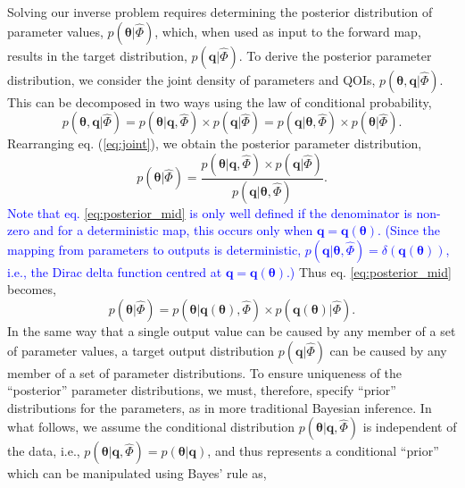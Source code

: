 Solving our inverse problem requires determining the posterior distribution of parameter values, $p(\boldsymbol{\theta}|\hat{\Phi})$, which, when used as input to the forward map, results in the target distribution, $p(\boldsymbol{q}|\hat{\Phi})$. To derive the posterior parameter distribution, we consider the joint density of parameters and QOIs, $p(\boldsymbol{\theta},\boldsymbol{q}|\hat{\Phi})$. This can be decomposed in two ways using the law of conditional probability,
%
\begin{equation}\label{eq:joint}
  p( \boldsymbol{\theta}, \boldsymbol{q}|\hat{\Phi})
= p( \boldsymbol{\theta}|\boldsymbol{q}, \hat{\Phi}) \times p(\boldsymbol{q}|\hat{\Phi})
= p( \boldsymbol{q}|\boldsymbol{\theta}, \hat{\Phi}) \times p(\boldsymbol{\theta}|\hat{\Phi}).
\end{equation}
%
Rearranging eq. (\ref{eq:joint}), we obtain the posterior parameter distribution,
%
\begin{equation}\label{eq:posterior_mid}
p(\boldsymbol{\theta}|\hat{\Phi})
= \frac{p(\boldsymbol{\theta}|\boldsymbol{q}, \hat{\Phi}) \times p(\boldsymbol{q}|\hat{\Phi})}{p(\boldsymbol{q}| \boldsymbol{\theta}, \hat{\Phi})}.
\end{equation}
%
\textcolor{blue}{Note that eq. \eqref{eq:posterior_mid} is only well defined if the denominator is non-zero and for a deterministic map, this occurs only when $\boldsymbol{q}=\boldsymbol{q}(\boldsymbol{\theta})$. (Since the mapping from parameters to outputs is deterministic, $p(\boldsymbol{q}| \boldsymbol{\theta}, \hat{\Phi})=\delta(\boldsymbol{q}(\boldsymbol{\theta}))$, i.e., the Dirac delta function centred at $\boldsymbol{q}=\boldsymbol{q}(\boldsymbol{\theta})$.)  }
 Thus eq. \eqref{eq:posterior_mid} becomes,
%
\begin{equation}\label{eq:posterior_mid1}
p(\boldsymbol{\theta}|\hat{\Phi})
= p(\boldsymbol{\theta}|\boldsymbol{q}(\boldsymbol{\theta}), \hat{\Phi}) \times p(\boldsymbol{q}(\boldsymbol{\theta})|\hat{\Phi}).
\end{equation}
%
In the same way that a single output value can be caused by any member of a set of parameter values, a target output distribution $p(\boldsymbol{q}|\hat{\Phi})$ can be caused by any member of a set of parameter distributions. To ensure uniqueness of the ``posterior'' parameter distributions, we must, therefore, specify ``prior'' distributions for the parameters, as in more traditional Bayesian inference. In what follows, we assume the conditional distribution $p(\boldsymbol{\theta}|\boldsymbol{q}, \hat{\Phi})$ is independent of the data, i.e., $p(\boldsymbol{\theta}|\boldsymbol{q}, \hat{\Phi})=p(\boldsymbol{\theta}|\boldsymbol{q})$, and thus represents a conditional ``prior'' which can be manipulated using Bayes' rule as,
